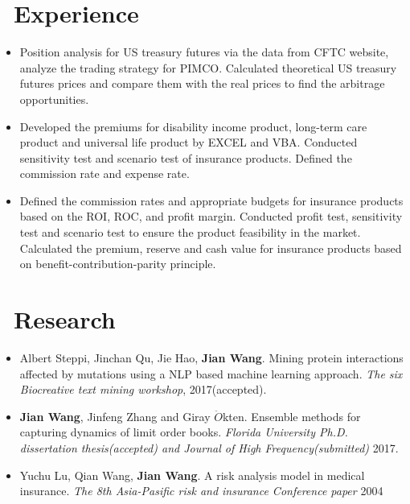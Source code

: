 \documentclass{resume}
\begin{document}
\section{\faGears\ Experience}
\large {}
\begin{itemize}\large
	\item Position analysis for US treasury futures via the data from CFTC website,  analyze the trading strategy for PIMCO. Calculated theoretical US treasury futures prices and compare them with the real prices to find the arbitrage opportunities.
\end{itemize}
\large {}
\begin{itemize}\large
  \item Developed the premiums for disability income product,  long-term care product and universal life product by EXCEL and VBA. Conducted sensitivity test and scenario test of insurance products. Defined the commission rate and expense rate. 
  
  
\end{itemize}

\large {}
\begin{itemize}\large
  \item Defined the commission rates and appropriate budgets for insurance products based on the ROI,  ROC, and profit margin. Conducted profit test,  sensitivity test and scenario test to ensure the product feasibility in the market. Calculated the premium,  reserve and cash value for insurance products based on benefit-contribution-parity principle.
\end{itemize}
\section{\faBook\ Research}

\begin{itemize}[parsep=0.5ex]\large
  \item Albert Steppi, Jinchan Qu, Jie Hao, \textbf{Jian Wang}. Mining protein interactions affected by mutations using a NLP based machine learning approach. \textit{The six Biocreative text mining workshop}, 2017(accepted).
  \item \textbf{Jian Wang}, Jinfeng Zhang and Giray $\ddot{O}$kten. Ensemble methods for capturing dynamics of limit order books. \textit{Florida University Ph.D. dissertation thesis(accepted) and Journal of High Frequency(submitted)} 2017.
  \item Yuchu Lu, Qian Wang, \textbf{Jian Wang}. A risk analysis model in medical insurance. \textit{The 8th Asia-Pasific risk and insurance Conference paper} 2004 
  
\end{itemize}
    
\end{document}
